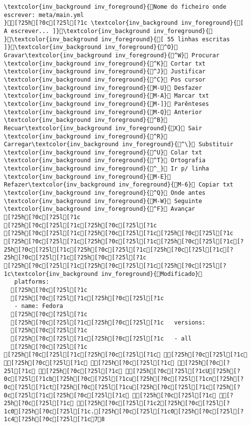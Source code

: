 \documentclass{scrartcl}
\begin{document}
\begin{Verbatim}
\textcolor{inv_background inv_foreground}{Nome do ficheiro onde escrever: meta/main.yml                                                                                                                                                 }[?25h[?0c[?25l[?1c \textcolor{inv_background inv_foreground}{[ A escrever... ]}\textcolor{inv_background inv_foreground}{          }\textcolor{inv_background inv_foreground}{[ 55 linhas escritas ]}\textcolor{inv_background inv_foreground}{^O} Gravar\textcolor{inv_background inv_foreground}{^W} Procurar      \textcolor{inv_background inv_foreground}{^K} Cortar txt    \textcolor{inv_background inv_foreground}{^J} Justificar    \textcolor{inv_background inv_foreground}{^C} Pos cursor    \textcolor{inv_background inv_foreground}{M-U} Desfazer     \textcolor{inv_background inv_foreground}{M-A} Marcar txt   \textcolor{inv_background inv_foreground}{M-]} Parênteses   \textcolor{inv_background inv_foreground}{M-Q} Anterior     \textcolor{inv_background inv_foreground}{^B} Recuar\textcolor{inv_background inv_foreground}{X} Sair    \textcolor{inv_background inv_foreground}{^R} Carregar\textcolor{inv_background inv_foreground}{^\} Substituir    \textcolor{inv_background inv_foreground}{^U} Colar txt     \textcolor{inv_background inv_foreground}{^T} Ortografia    \textcolor{inv_background inv_foreground}{^_} Ir p/ linha   \textcolor{inv_background inv_foreground}{M-E} Refazer\textcolor{inv_background inv_foreground}{M-6} Copiar txt   \textcolor{inv_background inv_foreground}{^Q} Onde antes    \textcolor{inv_background inv_foreground}{M-W} Seguinte     \textcolor{inv_background inv_foreground}{^F} Avançar
[?25h[?0c[?25l[?1c
[?25h[?0c[?25l[?1c[?25h[?0c[?25l[?1c
[?25h[?0c[?25l[?1c[?25h[?0c[?25l[?1c[?25h[?0c[?25l[?1c
[?25h[?0c[?25l[?1c[?25h[?0c[?25l[?1c[?25h[?0c[?25l[?1c[?25h[?0c[?25l[?1c[?25h[?0c[?25l[?1c[?25h[?0c[?25l[?1c[?25h[?0c[?25l[?1c[?25h[?0c[?25l[?1c
[?25h[?0c[?25l[?1c[?25h[?0c[?25l[?1c[?25h[?0c[?25l[?1c\textcolor{inv_background inv_foreground}{Modificado}
   platforms:
  [?25h[?0c[?25l[?1c
  [?25h[?0c[?25l[?1c[?25h[?0c[?25l[?1c
   - name: Fedora
  [?25h[?0c[?25l[?1c
  [?25h[?0c[?25l[?1c[?25h[?0c[?25l[?1c   versions:
  [?25h[?0c[?25l[?1c
  [?25h[?0c[?25l[?1c[?25h[?0c[?25l[?1c   - all
  [?25h[?0c[?25l[?1c
[?25h[?0c[?25l[?1c[?25h[?0c[?25l[?1c [?25h[?0c[?25l[?1c [?25h[?0c[?25l[?1c [?25h[?0c[?25l[?1c [?25h[?0c[?25l[?1c [?25h[?0c[?25l[?1c [?25h[?0c[?25l[?1cU[?25h[?0c[?25l[?1cb[?25h[?0c[?25l[?1cu[?25h[?0c[?25l[?1cn[?25h[?0c[?25l[?1ct[?25h[?0c[?25l[?1cu[?25h[?0c[?25l[?1c[?25h[?0c[?25l[?1c[?25h[?0c[?25l[?1c [?25h[?0c[?25l[?1c [?25h[?0c[?25l[?1c [?25h[?0c[?25l[?1c2[?25h[?0c[?25l[?1c0[?25h[?0c[?25l[?1c.[?25h[?0c[?25l[?1c0[?25h[?0c[?25l[?1c4[?25h[?0c[?25l[?1c78

\end{Verbatim}
\end{document}
